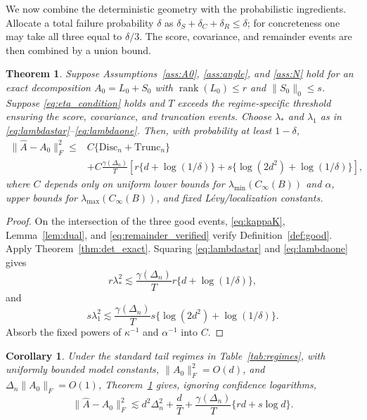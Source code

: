 \documentclass[12pt]{article}
\newtheorem{theorem}{Theorem}
\newtheorem{corollary}{Corollary}
\theoremstyle{definition}
\DeclareMathOperator{\rank}{rank}
\begin{document}
	We now combine the deterministic geometry with the probabilistic ingredients. Allocate a total failure probability $\delta$ as $\delta_S+\delta_C+\delta_R\le\delta$; for concreteness one may take all three equal to $\delta/3$. The score, covariance, and remainder events are then combined by a union bound.
	
	\begin{theorem}\label{thm:main_exact}
		Suppose Assumptions~\ref{ass:A0}, \ref{ass:angle}, and \ref{ass:N} hold for an exact decomposition $A_0=L_0+S_0$ with $\rank(L_0)\le r$ and $\|S_0\|_0\le s$. Suppose \eqref{eq:eta_condition} holds and $T$ exceeds the regime-specific threshold ensuring the score, covariance, and truncation events. Choose $\lambda_*$ and $\lambda_1$ as in \eqref{eq:lambdastar}--\eqref{eq:lambdaone}. Then, with probability at least $1-\delta$,
		\begin{align}
			\|\widehat A-A_0\|_F^2
			\le{}&C\{\mathrm{Disc}_n+\mathrm{Trunc}_n\}\nonumber\\
			&+C\frac{\gamma(\Delta_n)}T
			\left[r\{d+\log(1/\delta)\}+s\{\log(2d^2)+\log(1/\delta)\}\right],
			\label{eq:main_exact}
		\end{align}
		where $C$ depends only on uniform lower bounds for $\lambda_{\min}(C_\infty(B))$ and $\alpha$, upper bounds for $\lambda_{\max}(C_\infty(B))$, and fixed L\'evy/localization constants.
	\end{theorem}
	
	\begin{proof}
		On the intersection of the three good events, \eqref{eq:kappaK}, Lemma~\ref{lem:dual}, and \eqref{eq:remainder_verified} verify Definition~\ref{def:good}. Apply Theorem~\ref{thm:det_exact}. Squaring \eqref{eq:lambdastar} and \eqref{eq:lambdaone} gives
		\[	r\lambda_*^2\lesssim \frac{\gamma(\Delta_n)}T r\{d+\log(1/\delta)\},\] and	\[s\lambda_1^2\lesssim \frac{\gamma(\Delta_n)}T s\{\log(2d^2)+\log(1/\delta)\}. \]
		Absorb the fixed powers of $\kappa^{-1}$ and $\alpha^{-1}$ into $C$.
	\end{proof}
	
	\begin{corollary}\label{cor:standard}
		Under the standard tail regimes in Table~\ref{tab:regimes}, with uniformly bounded model constants, $\|A_0\|_F^2=O(d)$, and $\Delta_n\|A_0\|_F=O(1)$, Theorem~\ref{thm:main_exact} gives, ignoring confidence logarithms,
		\begin{equation}
			\|\widehat A-A_0\|_F^2 \lesssim
			d^2\Delta_n^2+\frac dT	+\frac{\gamma(\Delta_n)}T\{rd+s\log d\}.
			\label{eq:standard_rate}
		\end{equation}
	\end{corollary}
	
\end{document}

